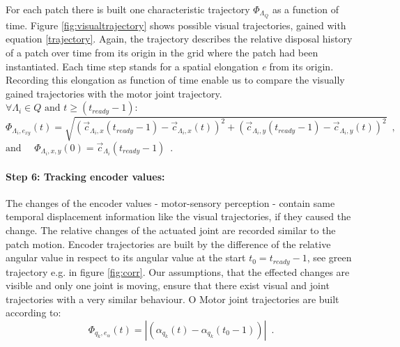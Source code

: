 \documentclass[conference]{IEEEtran}
\begin{document}
For each patch there is built one characteristic trajectory $ \Phi_{\Lambda_Q} $ as a function of time. Figure \ref{fig:visualtrajectory} shows possible visual trajectories, gained with equation \ref{trajectory}. Again, the trajectory describes the relative disposal history of a patch over time from its origin in the grid where the patch had been instantiated. Each time step stands for a spatial elongation \textit{e} from its origin. Recording this elongation as function of time enable us to compare the visually gained trajectories with the motor joint trajectory. 
%
$\forall \Lambda_i \in Q \mbox{ and } t \geq \left( t_{ready} -1\right) :   $
\begin{equation}
\label{trajectory}
	\Phi_{\Lambda_{i}, e_{xy}} \left( t \right) = \sqrt { \left( { \vec{c}_{ \Lambda_{i} , x } \left( t_{ready} -1 \right) - \vec{c}_{\Lambda_{i} , x} \left( t \right)} \right)^2 +  \left( \vec{c}_{\Lambda_{i} , y} \left( t_{ready} -1 \right) - \vec{c}_{\Lambda_{i} , y}\left( t \right) \right)^2} \enspace ,
\end{equation} 
$\mbox{and } \quad \Phi_{\Lambda_i , x,y} \left( 0 \right) = \vec{c}_{\Lambda_i} \left( t_{ready} -1 \right) \enspace .$
%
%
%
%
\paragraph{Step 6: Tracking encoder values:}
\label{halose:halo:algorithm:step8enc}
%
The changes of the encoder values - motor-sensory perception - contain same temporal displacement information like the visual trajectories, if they caused the change. The relative changes of the actuated joint are recorded similar to the patch motion.  Encoder trajectories are built by the difference of the relative angular value in respect to its angular value at the start $t_0 = t_{ready}-1$, see green trajectory e.g. in figure \ref{fig:corr}. Our assumptions, that the effected changes are visible and only one joint is moving, ensure that there exist visual and joint trajectories with a very similar behaviour. O%
Motor joint trajectories are built according to: 
\begin{equation}
\label{jointtrajectory}
	\Phi_{q_{k}, e_{\alpha}} \left(t\right) = \left| \left( \alpha_{q_{k}} \left(t\right) - \alpha_{q_{k}} \left(t_0-1\right)\right) \right| \enspace .
\end{equation} 
%
%
\end{document}
